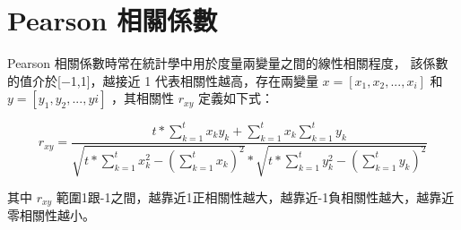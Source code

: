\chapter{Pearson 相關係數}
\label{chapter:intro}
Pearson 相關係數時常在統計學中用於度量兩變量之間的線性相關程度， 該係數的值介於[−1,1]，越接近 1 代表相關性越高，存在兩變量 \(x=[x_1,x_2,...,x_i]\) 和 \(y=[y_1,y_2,...,yi]\)  ，其相關性 \(r_{xy}\) 定義如下式：


$$r_{xy}=\frac{t\ast \sum_{k=1}^{t}x_ky_k+\sum_{k=1}^{t}x_k\sum_{k=1}^{t}y_k}{\sqrt{t\ast \sum_{k=1}^{t}x_k^2-(\sum_{k=1}^{t}x_k)^2}\ast\sqrt{t\ast \sum_{k=1}^{t}y_k^2-(\sum_{k=1}^{t}y_k)^2}}$$


其中 \(r_{xy}\)  範圍1跟-1之間，越靠近1正相關性越大，越靠近-1負相關性越大，越靠近零相關性越小。
    
